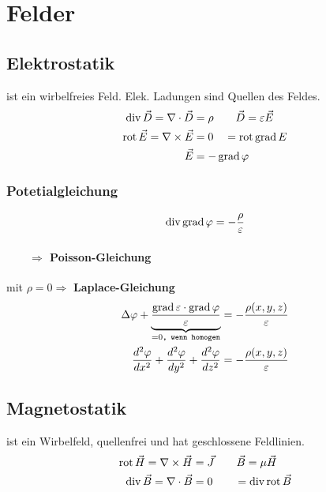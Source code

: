 \section{Felder}

\subsection{Elektrostatik}
ist ein wirbelfreies Feld. Elek. Ladungen sind Quellen des Feldes.
\begin{align*}
    \operatorname{div} \vec{D} = \nabla \cdot \vec{D}  & = \rho       \qquad          \vec{D} = \varepsilon \vec{E} \\
    \operatorname{rot} \vec{E} = \nabla \times \vec{E} & = 0 \quad = \operatorname{rot} \operatorname{grad} E                               \\
    \vec{E}                                & =- \operatorname{grad} \varphi
\end{align*}
\subsubsection{Potetialgleichung}
\[
    \operatorname{div} \operatorname{grad} \varphi = - \dfrac{\rho}{\varepsilon}
\]
\paragraph{$\qquad \Rightarrow$ Poisson-Gleichung}
mit $\rho = 0 \Rightarrow$ \textbf{Laplace-Gleichung}
\begin{align*}
    \Delta \varphi + \underbrace{ \dfrac{\operatorname{grad} \varepsilon \cdot \operatorname{grad} \varphi}{\varepsilon}}_{= 0\texttt{, wenn homogen}}
     & = - \dfrac{\rho (x, y, z)}{\varepsilon} \\
    \frac{d^2 \varphi}{d x^2} + \frac{d^2 \varphi}{d y^2} + \frac{d^2 \varphi}{d z^2}
     & = - \dfrac{\rho (x, y, z)}{\varepsilon}
\end{align*}


\subsection{Magnetostatik}
ist ein Wirbelfeld, quellenfrei und hat geschlossene Feldlinien.
\begin{align*}
    \operatorname{rot} \vec{H} = \nabla \times \vec{H} & = \vec{J}  \qquad \vec{B} = \mu \vec{H}\\
    \operatorname{div} \vec{B} = \nabla \cdot \vec{B}  & = 0        \qquad = \operatorname{div} \operatorname{rot} \vec{B}
\end{align*}



